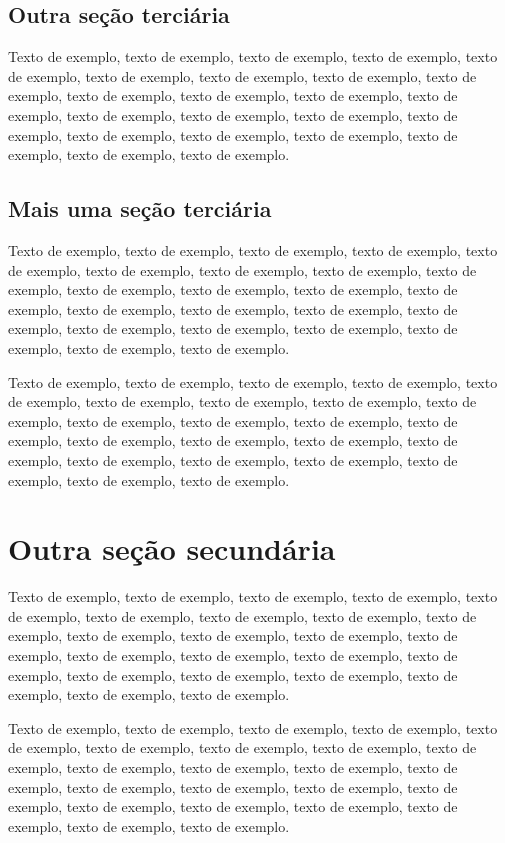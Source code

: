 \documentclass[
	12pt,				%
	oneside,			%
	a4paper,			%
	english,			%
	brazil				%
	]{abntex2ppgsi}
\begin{document}
\subsection{Outra seção terciária}

Texto de exemplo, texto de exemplo, texto de exemplo, texto de exemplo, texto de exemplo, texto de exemplo, texto de exemplo, texto de exemplo, texto de exemplo, texto de exemplo, texto de exemplo, texto de exemplo, texto de exemplo, texto de exemplo, texto de exemplo, texto de exemplo, texto de exemplo, texto de exemplo, texto de exemplo, texto de exemplo, texto de exemplo, texto de exemplo, texto de exemplo.

\subsection{Mais uma seção terciária}

Texto de exemplo, texto de exemplo, texto de exemplo, texto de exemplo, texto de exemplo, texto de exemplo, texto de exemplo, texto de exemplo, texto de exemplo, texto de exemplo, texto de exemplo, texto de exemplo, texto de exemplo, texto de exemplo, texto de exemplo, texto de exemplo, texto de exemplo, texto de exemplo, texto de exemplo, texto de exemplo, texto de exemplo, texto de exemplo, texto de exemplo.

Texto de exemplo, texto de exemplo, texto de exemplo, texto de exemplo, texto de exemplo, texto de exemplo, texto de exemplo, texto de exemplo, texto de exemplo, texto de exemplo, texto de exemplo, texto de exemplo, texto de exemplo, texto de exemplo, texto de exemplo, texto de exemplo, texto de exemplo, texto de exemplo, texto de exemplo, texto de exemplo, texto de exemplo, texto de exemplo, texto de exemplo.

\section{Outra seção secundária}

Texto de exemplo, texto de exemplo, texto de exemplo, texto de exemplo, texto de exemplo, texto de exemplo, texto de exemplo, texto de exemplo, texto de exemplo, texto de exemplo, texto de exemplo, texto de exemplo, texto de exemplo, texto de exemplo, texto de exemplo, texto de exemplo, texto de exemplo, texto de exemplo, texto de exemplo, texto de exemplo, texto de exemplo, texto de exemplo, texto de exemplo.

Texto de exemplo, texto de exemplo, texto de exemplo, texto de exemplo, texto de exemplo, texto de exemplo, texto de exemplo, texto de exemplo, texto de exemplo, texto de exemplo, texto de exemplo, texto de exemplo, texto de exemplo, texto de exemplo, texto de exemplo, texto de exemplo, texto de exemplo, texto de exemplo, texto de exemplo, texto de exemplo, texto de exemplo, texto de exemplo, texto de exemplo.
\end{document}
